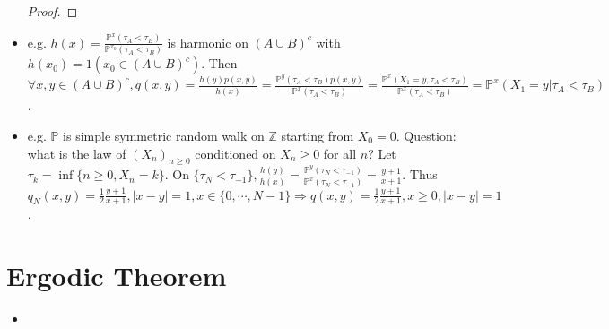 \documentclass[UTF8]{ctexart}
\theoremstyle{plain}
\theoremstyle{nonumberplain}
\newtheorem{proof}{\small\emph{Proof}}
\numberwithin{equation}{section} %
\renewcommand{\P}{\mathbb{P}}
\begin{document}
\begin{itemize}
\begin{proof}
  \end{proof}
  \item e.g. $h(x)=\frac{\P^x(\tau_A<\tau_B)}{\P^{x_0}(\tau_A<\tau_B)}$ is harmonic on $(A\cup B)^c$ with $h(x_0)=1 (x_0\in(A\cup B)^c)$. Then $\forall x,y\in(A\cup B)^c,q(x,y)=\frac{h(y)p(x,y)}{h(x)}=\frac{\P^y(\tau_A<\tau_B)p(x,y)}{\P^x(\tau_A<\tau_B)}=\frac{\P^x(X_1=y,\tau_A<\tau_B)}{\P^x(\tau_A<\tau_B)}=\P^x(X_1=y|\tau_A<\tau_B)$.
  \item e.g. $\P$ is simple symmetric random walk on $\mathbb{Z}$ starting from $X_0=0$. Question: what is the law of $(X_n)_{n\geq 0}$ conditioned on $X_n\geq 0$ for all $n$? Let $\tau_k=\inf\{n\geq 0,X_n=k\}$. On $\{\tau_N<\tau_{-1}\},\frac{h(y)}{h(x)}=\frac{\P^y(\tau_N<\tau_{-1})}{\P^x(\tau_N<\tau_{-1})}=\frac{y+1}{x+1}$. Thus $q_N(x,y)=\frac{1}{2}\frac{y+1}{x+1},|x-y|=1,x\in\{0,\cdots,N-1\}\Rightarrow q(x,y)=\frac{1}{2}\frac{y+1}{x+1},x\geq 0,|x-y|=1$.
\end{itemize}
\section{Ergodic Theorem}
\begin{itemize}
  \item 
\end{itemize}
\end{document}
